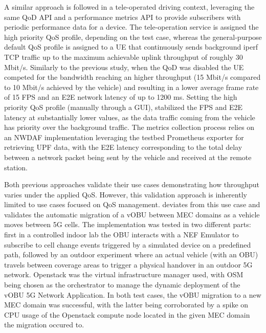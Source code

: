 A similar approach is followed in a tele-operated driving context, leveraging the same \acs{QoD} \acs{API} and a performance metrics \acs{API} to provide subscribers with periodic performance data for a device. The tele-operation service is assigned the high priority \acs{QoS} profile, depending on the test case, whereas the general-purpose default \acs{QoS} profile is assigned to a \ac{UE} that continuously sends background iperf \acs{TCP} traffic up to the maximum achievable uplink throughput of roughly 30 Mbit/s. Similarly to the previous study, when the \acs{QoD} was disabled the \acs{UE} competed for the bandwidth reaching an higher throughput (15 Mbit/s compared to 10 Mbit/s achieved by the vehicle) and resulting in a lower average frame rate of 15 \acs{FPS} and an \acs{E2E} network latency of up to 1200 ms. Setting the high priority \acs{QoS} profile (manually through a \acs{GUI}), stabilized the \acs{FPS} and \acs{E2E} latency at substantially lower values, as the data traffic coming from the vehicle has priority over the background traffic. The metrics collection process relies on an \acs{NWDAF} implementation leveraging the testbed Prometheus exporter for retrieving \acs{UPF} data, with the \acs{E2E} latency corresponding to the total delay between a network packet being sent by the vehicle and received at the remote station.

Both previous approaches validate their use cases demonstrating how throughput varies under the applied \acs{QoS}. However, this validation approach is inherently limited to use cases focused on \acs{QoS} management. \cite{VirtualOnBoardUnitMigration} deviates from this use case and validates the automatic migration of a v\acs{OBU} between \acs{MEC} domains as a vehicle moves between \acs{5G} cells. The implementation was tested in two different parts: first in a controlled indoor lab the \acs{OBU} interacts with a \acs{NEF} Emulator to subscribe to cell change events triggered by a simulated device on a predefined path, followed by an outdoor experiment where an actual vehicle (with an \acs{OBU}) travels between coverage areas to trigger a physical handover in an outdoor \acs{5G} network. Openstack was the virtual infrastructure manager used, with \acs{OSM} being chosen as the orchestrator to manage the dynamic deployment of the v\acs{OBU} \acs{5G} Network Application. In both test cases, the v\acs{OBU} migration to a new \acs{MEC} domain was successful, with the latter being corroborated by a spike on \acs{CPU} usage of the Openstack compute node located in the given \acs{MEC} domain the migration occured to.


